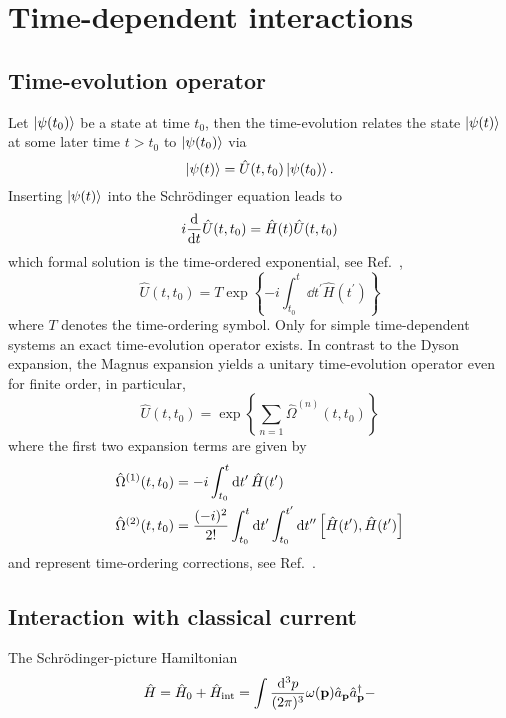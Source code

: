 \section{Time-dependent interactions}

\subsection{Time-evolution operator}

Let $\ket{\psi(t_0)}$ be a state at time $t_0$, then the time-evolution relates the state $\ket{\psi(t)}$ at some later time $t>t_0$ to $\ket{\psi(t_0)}$ via
\begin{equation}
	\ket{\psi(t)}
	=
	\hat{U}(t,t_0)
	\ket{\psi(t_0)}
	.
\end{equation}
Inserting $\ket{\psi(t)}$ into the Schrödinger equation leads to
\begin{equation}
	i\dv{t}
	\hat{U}(t,t_0)
	=
	\hat{H}(t)
	\hat{U}(t,t_0)
\end{equation}
which formal solution is the time-ordered exponential, see Ref.~\cite[p.~380]{Bartelmann2018},
\begin{equation}
	\hat{U}(t,t_0)
	=
	T\exp\left\{
		-i
		\int_{t_0}^t\dd{t^\prime}
		\hat{H}(t^\prime)
	\right\}
\end{equation}
where $T$ denotes the time-ordering symbol.
Only for simple time-dependent systems an exact time-evolution operator exists.
In contrast to the Dyson expansion, the Magnus expansion yields a unitary time-evolution operator even for finite order, in particular,
\begin{equation}
	\hat{U}(t,t_0)
	=
	\exp\left\{
		\sum_{n=1}
		\hat{\Omega}^{(n)}(t,t_0)
	\right\}
\end{equation}
where the first two expansion terms are given by
\begin{align}
	\hat{\Omega}^{(1)}(t,t_0)
	&=
	-i
	\int_{t_0}^t\dd{t^\prime}
	\hat{H}(t^\prime)
	\\
	\hat{\Omega}^{(2)}(t,t_0)
	&=
	\frac{(-i)^2}{2!}
	\int_{t_0}^t\dd{t^\prime}
	\int_{t_0}^{t^\prime}\dd{t^{\prime\prime}}
	\comm{\hat{H}(t^\prime)}{\hat{H}(t^\prime)}
\end{align}
and represent time-ordering corrections, see Ref.~\cite{QuesadaMejia2015}.

\subsection{Interaction with classical current}

The Schrödinger-picture Hamiltonian
\begin{equation}
	\hat{H}
	=
	\hat{H}_0
	+
	\hat{H}_\text{int}
	=
	\int\frac{\dd[3]{p}}{(2\pi)^3}
	\omega(\vb{p})
	\hat{a}_{\vb{p}}
	\hat{a}_{\vb{p}}^\dagger
	-	
\end{equation}